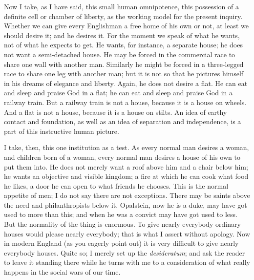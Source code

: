 \documentclass{book}
\begin{document}
Now I take, as I have said, this small human omnipotence, this possession of a definite cell or chamber of liberty, as the working model for the present inquiry. Whether we can give every Englishman a free home of his own or not, at least we should desire it; and he desires it. For the moment we speak of what he wants, not of what he expects to get. He wants, for instance, a separate house; he does not want a semi-detached house. He may be forced in the commercial race to share one wall with another man. Similarly he might be forced in a three-legged race to share one leg with another man; but it is not so that he pictures himself in his dreams of elegance and liberty. Again, he does not desire a flat. He can eat and sleep and praise God in a flat; he can eat and sleep and praise God in a railway train. But a railway train is not a house, because it is a house on wheels. And a flat is not a house, because it is a house on stilts. An idea of earthy contact and foundation, as well as an idea of separation and independence, is a part of this instructive human picture.

I take, then, this one institution as a test. As every normal man desires a woman, and children born of a woman, every normal man desires a house of his own to put them into. He does not merely want a roof above him and a chair below him; he wants an objective and visible kingdom; a fire at which he can cook what food he likes, a door he can open to what friends he chooses. This is the normal appetite of men; I do not say there are not exceptions. There may be saints above the need and philanthropists below it. Opalstein, now he is a duke, may have got used to more than this; and when he was a convict may have got used to less. But the normality of the thing is enormous. To give nearly everybody ordinary houses would please nearly everybody; that is what I assert without apology. Now in modern England (as you eagerly point out) it is very difficult to give nearly everybody houses. Quite so; I merely set up the \emph{desideratum}; and ask the reader to leave it standing there while he turns with me to a consideration of what really happens in the social wars of our time.
\end{document}
